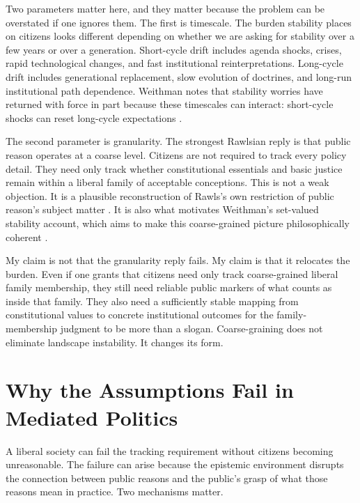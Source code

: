 \documentclass[12pt]{article}
\begin{document}
Two parameters matter here, and they matter because the problem can be overstated if one ignores them. The first is timescale. The burden stability places on citizens looks different depending on whether we are asking for stability over a few years or over a generation. Short-cycle drift includes agenda shocks, crises, rapid technological changes, and fast institutional reinterpretations. Long-cycle drift includes generational replacement, slow evolution of doctrines, and long-run institutional path dependence. Weithman notes that stability worries have returned with force in part because these timescales can interact: short-cycle shocks can reset long-cycle expectations \parencite[p.~1188]{Weithman2024Rescuing}.

The second parameter is granularity. The strongest Rawlsian reply is that public reason operates at a coarse level. Citizens are not required to track every policy detail. They need only track whether constitutional essentials and basic justice remain within a liberal family of acceptable conceptions. This is not a weak objection. It is a plausible reconstruction of Rawls's own restriction of public reason's subject matter \parencite[pp.~453--454]{rawls2005political}. It is also what motivates Weithman's set-valued stability account, which aims to make this coarse-grained picture philosophically coherent \parencite[p.~205]{Weithman2023FixedPoints}.

My claim is not that the granularity reply fails. My claim is that it relocates the burden. Even if one grants that citizens need only track coarse-grained liberal family membership, they still need reliable public markers of what counts as inside that family. They also need a sufficiently stable mapping from constitutional values to concrete institutional outcomes for the family-membership judgment to be more than a slogan. Coarse-graining does not eliminate landscape instability. It changes its form.

\section{Why the Assumptions Fail in Mediated Politics}

A liberal society can fail the tracking requirement without citizens becoming unreasonable. The failure can arise because the epistemic environment disrupts the connection between public reasons and the public's grasp of what those reasons mean in practice. Two mechanisms matter.
\end{document}
